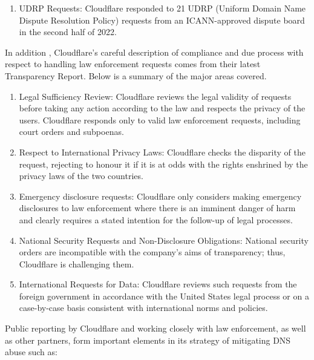 \begin{enumerate}
\begin{enumerate}
    \item UDRP Requests: Cloudflare responded to 21 UDRP (Uniform Domain Name Dispute Resolution Policy) requests from an ICANN-approved dispute board in the second half of 2022.
    
\end{enumerate}

In addition , Cloudflare's careful description of compliance and due process with respect to handling law enforcement requests comes from their latest Transparency Report. Below is a summary of the major areas covered.

\begin{enumerate}
    \item Legal Sufficiency Review: Cloudflare reviews the legal validity of requests before taking any action according to the law and respects the privacy of the users. Cloudflare responds only to valid law enforcement requests, including court orders and subpoenas.

 \item Respect to International Privacy Laws: Cloudflare checks the disparity of the request, rejecting to honour it if it is at odds with the rights enshrined by the privacy laws of the two countries.


 \item Emergency disclosure requests: Cloudflare only considers making emergency disclosures to law enforcement where there is an imminent danger of harm and clearly requires a stated intention for the follow-up of legal processes.

 \item  National Security Requests and Non-Disclosure Obligations: National security orders are incompatible with the company's aims of transparency; thus, Cloudflare is challenging them.

 \item  International Requests for Data: Cloudflare reviews such requests from the foreign government in accordance with the United States legal process or on a case-by-case basis consistent with international norms and policies.

\end{enumerate}

Public reporting by Cloudflare and working closely with law enforcement, as well as other partners, form important elements in its strategy of mitigating DNS abuse such as: 

\begin{enumerate}


\end{enumerate}
\end{enumerate}
